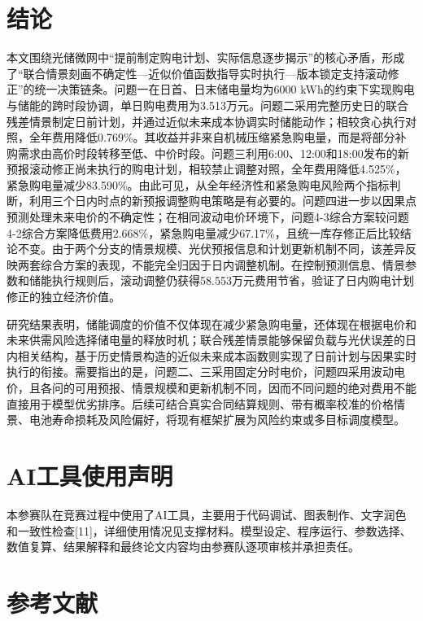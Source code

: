 \documentclass[zihao=-4,a4paper,UTF8,fontset=none]{ctexart}
\begin{document}
\section{结论}\label{ux7ed3ux8bba}

本文围绕光储微网中``提前制定购电计划、实际信息逐步揭示''的核心矛盾，形成了``联合情景刻画不确定性---近似价值函数指导实时执行---版本锁定支持滚动修正''的统一决策链条。问题一在日首、日末储电量均为6000 kWh的约束下实现购电与储能的跨时段协调，单日购电费用为3.513万元。问题二采用完整历史日的联合残差情景制定日前计划，并通过近似未来成本协调实时储能动作；相较贪心执行对照，全年费用降低0.769\%。其收益并非来自机械压缩紧急购电量，而是将部分补购需求由高价时段转移至低、中价时段。问题三利用6:00、12:00和18:00发布的新预报滚动修正尚未执行的购电计划，相较禁止调整对照，全年费用降低4.525\%，紧急购电量减少83.590\%。由此可见，从全年经济性和紧急购电风险两个指标判断，利用三个日内时点的新预报调整购电策略是有必要的。问题四进一步以因果点预测处理未来电价的不确定性；在相同波动电价环境下，问题4-3综合方案较问题4-2综合方案降低费用2.668\%，紧急购电量减少67.17\%，且统一库存修正后比较结论不变。由于两个分支的情景规模、光伏预报信息和计划更新机制不同，该差异反映两套综合方案的表现，不能完全归因于日内调整机制。在控制预测信息、情景参数和储能执行规则后，滚动调整仍获得58.553万元费用节省，验证了日内购电计划修正的独立经济价值。

研究结果表明，储能调度的价值不仅体现在减少紧急购电量，还体现在根据电价和未来供需风险选择储电量的释放时机；联合残差情景能够保留负载与光伏误差的日内相关结构，基于历史情景构造的近似未来成本函数则实现了日前计划与因果实时执行的衔接。需要指出的是，问题二、三采用固定分时电价，问题四采用波动电价，且各问的可用预报、情景规模和更新机制不同，因而不同问题的绝对费用不能直接用于模型优劣排序。后续可结合真实合同结算规则、带有概率校准的价格情景、电池寿命损耗及风险偏好，将现有框架扩展为风险约束或多目标调度模型。

\section*{AI工具使用声明}

本参赛队在竞赛过程中使用了AI工具，主要用于代码调试、图表制作、文字润色和一致性检查{[}11{]}，详细使用情况见支撑材料。模型设定、程序运行、参数选择、数值复算、结果解释和最终论文内容均由参赛队逐项审核并承担责任。

\section*{参考文献}
\end{document}
